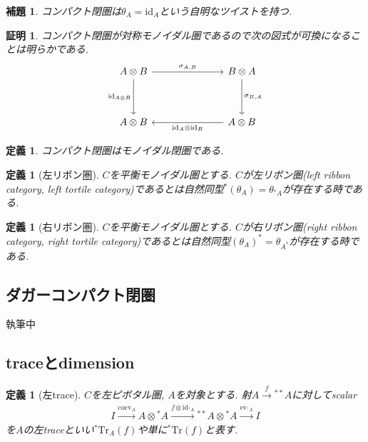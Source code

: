 \documentclass[a4paper,12pt]{ltjsarticle}
\theoremstyle{break}
\newtheorem{defn}[thm]{定義}
\newtheorem{lem}[thm]{補題}
\newtheorem*{prf}{証明}
\newcommand{\xr}[1]{\xrightarrow{#1}}
\newcommand{\id}{\mathrm{id}}
\newcommand{\eva}{\mathrm{ev}}
\newcommand{\coev}{\mathrm{coev}}
\newcommand{\si}{\sigma}
\newcommand{\ot}{\otimes}
\newcommand{\tra}{\mathrm{Tr}}
\numberwithin{equation}{section}
\begin{document}
\begin{lem}
  コンパクト閉圏は$\theta_A=\id_A$という自明なツイストを持つ. 
\end{lem}

\begin{prf}
  コンパクト閉圏が対称モノイダル圏であるので次の図式が可換になることは明らかである.
  \[\begin{tikzcd}
    {A \ot B} &&& {B \ot A} \\
    \\
    {A \ot B} &&& {A \ot B}
    \arrow["{\si_{A,B}}", from=1-1, to=1-4]
    \arrow["{\id_{A \ot B}}"', from=1-1, to=3-1]
    \arrow["{\si_{B,A}}", from=1-4, to=3-4]
    \arrow["{\id_A \ot \id_B}", from=3-4, to=3-1]
  \end{tikzcd}\]
\end{prf}

\begin{defn}
  コンパクト閉圏はモノイダル閉圏である. 
\end{defn}

\begin{defn}[左リボン圏]
  $C$を平衡モノイダル圏とする. $C$が左リボン圏(left ribbon category, left tortile category)であるとは自然同型${}^*(\theta_A)=\theta_{{}^*A}$が存在する時である. 
\end{defn}

\begin{defn}[右リボン圏]
  $C$を平衡モノイダル圏とする. $C$が右リボン圏(right ribbon category, right tortile category)であるとは自然同型$(\theta_A)^*=\theta_{A^*}$が存在する時である. 
\end{defn}

\subsection{ダガーコンパクト閉圏}
執筆中

\subsection{traceとdimension}

\begin{defn}[左trace]
  $C$を左ピボタル圏, $A$を対象とする. 
  射$A \xr{f} {}^{**}A$に対してscalar
  \begin{align*}
    I \xr{\coev_A} A \ot {}^*A \xr{f \ot \id_{{}^*A}} {}^{**}A \ot {}^*A \xr{\eva_{{}^*A}} I
  \end{align*}  
    を$A$の左traceといい${}^*\tra_A(f)$や単に${}^*\tra(f)$と表す.  
\end{defn}
\end{document}
